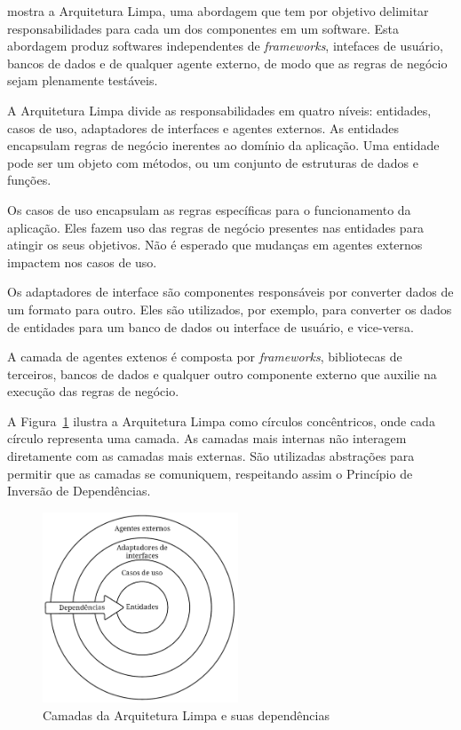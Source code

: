  mostra a Arquitetura Limpa, uma abordagem que tem por objetivo delimitar responsabilidades para cada um dos componentes em um software.
Esta abordagem produz softwares independentes de \emph{frameworks}, intefaces de usuário, bancos de dados e de qualquer agente externo, de modo que as regras de negócio sejam plenamente testáveis.

A Arquitetura Limpa divide as responsabilidades em quatro níveis: entidades, casos de uso, adaptadores de interfaces e agentes externos.
As entidades encapsulam regras de negócio inerentes ao domínio da aplicação.
Uma entidade pode ser um objeto com métodos, ou um conjunto de estruturas de dados e funções.

Os casos de uso encapsulam as regras específicas para o funcionamento da aplicação.
Eles fazem uso das regras de negócio presentes nas entidades para atingir os seus objetivos.
Não é esperado que mudanças em agentes externos impactem nos casos de uso.

Os adaptadores de interface são componentes responsáveis por converter dados de um formato para outro.
Eles são utilizados, por exemplo, para converter os dados de entidades para um banco de dados ou interface de usuário, e vice-versa.

A camada de agentes extenos é composta por \emph{frameworks}, bibliotecas de terceiros, bancos de dados e qualquer outro componente externo que auxilie na execução das regras de negócio.

A Figura~\ref{fig:clean_arch_circles} ilustra a Arquitetura Limpa como círculos concêntricos, onde cada círculo representa uma camada.
As camadas mais internas não interagem diretamente com as camadas mais externas.
São utilizadas abstrações para permitir que as camadas se comuniquem, respeitando assim o Princípio de Inversão de Dependências.

\begin{figure}[ht]
	\centering
	\includegraphics[width=0.52\textwidth]{images/clean_arch_circles.png}
	\caption{Camadas da Arquitetura Limpa e suas dependências}
	\label{fig:clean_arch_circles}
\end{figure}